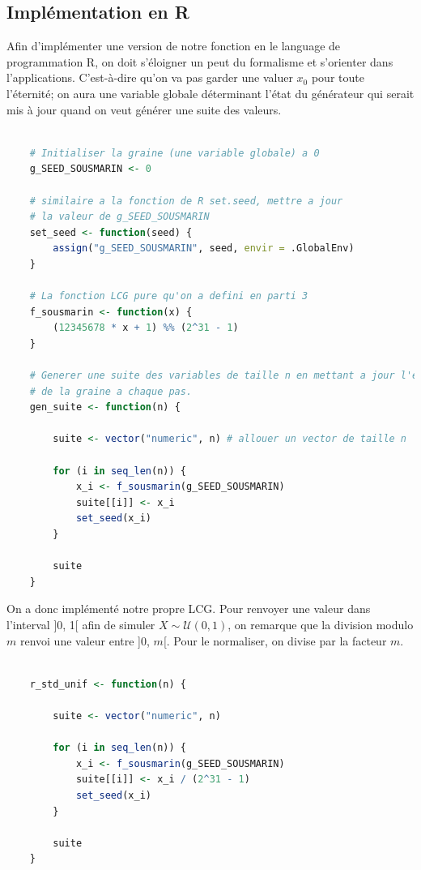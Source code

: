 \documentclass[10pt]{article} %
\begin{document}
\subsection{Implémentation en R}
Afin d'implémenter une version de notre fonction en le language de programmation R, on doit s'éloigner un peut du formalisme et s'orienter dans l'applications. C'est-à-dire qu'on va pas garder une valuer $x_0$
pour toute l'éternité; on aura une variable globale déterminant l'état du générateur qui serait mis à jour quand on veut générer une suite des valeurs.


\begin{lstlisting}[language =R]

    # Initialiser la graine (une variable globale) a 0
    g_SEED_SOUSMARIN <- 0

    # similaire a la fonction de R set.seed, mettre a jour
    # la valeur de g_SEED_SOUSMARIN
    set_seed <- function(seed) {
        assign("g_SEED_SOUSMARIN", seed, envir = .GlobalEnv)
    }

    # La fonction LCG pure qu'on a defini en parti 3
    f_sousmarin <- function(x) {
        (12345678 * x + 1) %% (2^31 - 1)
    }

    # Generer une suite des variables de taille n en mettant a jour l'etat
    # de la graine a chaque pas.
    gen_suite <- function(n) {

        suite <- vector("numeric", n) # allouer un vector de taille n

        for (i in seq_len(n)) {
            x_i <- f_sousmarin(g_SEED_SOUSMARIN)
            suite[[i]] <- x_i
            set_seed(x_i)
        }

        suite
    }
\end{lstlisting}

On a donc implémenté notre propre LCG. Pour renvoyer une valeur dans l'interval ]0, 1[ afin de simuler $X \sim \mathcal{U}(0, 1)$, on remarque que
la division modulo $m$ renvoi une valeur entre ]0, $m$[. Pour le normaliser, on divise par la facteur $m$.

\begin{lstlisting}[language=R]

    r_std_unif <- function(n) {

        suite <- vector("numeric", n)

        for (i in seq_len(n)) {
            x_i <- f_sousmarin(g_SEED_SOUSMARIN)
            suite[[i]] <- x_i / (2^31 - 1)
            set_seed(x_i)
        }

        suite
    }

\end{lstlisting}
\end{document}
